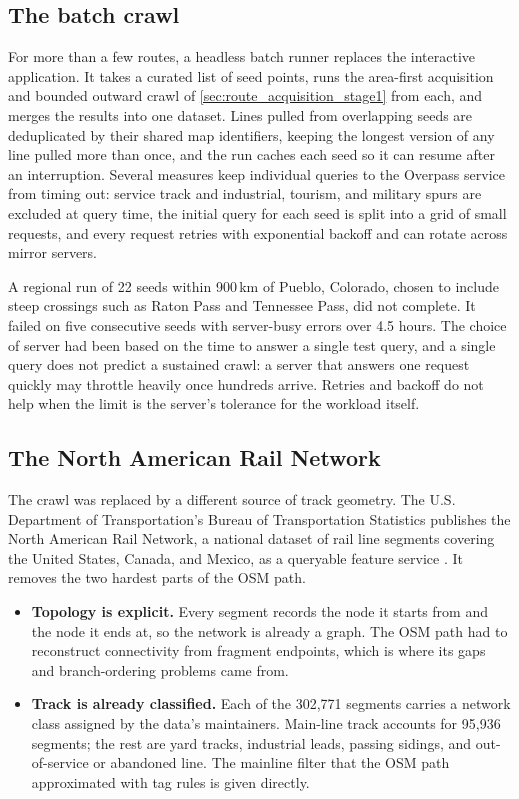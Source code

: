 \subsection{The batch crawl}

For more than a few routes, a headless batch runner replaces the interactive application. It takes a curated list of seed points, runs the area-first acquisition and bounded outward crawl of \cref{sec:route_acquisition_stage1} from each, and merges the results into one dataset. Lines pulled from overlapping seeds are deduplicated by their shared map identifiers, keeping the longest version of any line pulled more than once, and the run caches each seed so it can resume after an interruption. Several measures keep individual queries to the Overpass service from timing out: service track and industrial, tourism, and military spurs are excluded at query time, the initial query for each seed is split into a grid of small requests, and every request retries with exponential backoff and can rotate across mirror servers.

A regional run of 22 seeds within 900\,km of Pueblo, Colorado, chosen to include steep crossings such as Raton Pass and Tennessee Pass, did not complete. It failed on five consecutive seeds with server-busy errors over 4.5 hours. The choice of server had been based on the time to answer a single test query, and a single query does not predict a sustained crawl: a server that answers one request quickly may throttle heavily once hundreds arrive. Retries and backoff do not help when the limit is the server's tolerance for the workload itself.

\subsection{The North American Rail Network}

The crawl was replaced by a different source of track geometry. The U.S. Department of Transportation's Bureau of Transportation Statistics publishes the North American Rail Network, a national dataset of rail line segments covering the United States, Canada, and Mexico, as a queryable feature service \cite{narn}. It removes the two hardest parts of the OSM path.

\begin{itemize}
    \item \textbf{Topology is explicit.} Every segment records the node it starts from and the node it ends at, so the network is already a graph. The OSM path had to reconstruct connectivity from fragment endpoints, which is where its gaps and branch-ordering problems came from.
    \item \textbf{Track is already classified.} Each of the 302,771 segments carries a network class assigned by the data's maintainers. Main-line track accounts for 95,936 segments; the rest are yard tracks, industrial leads, passing sidings, and out-of-service or abandoned line. The mainline filter that the OSM path approximated with tag rules is given directly.
\end{itemize}

